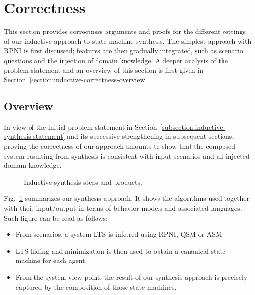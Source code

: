 \section{Correctness\label{section:inductive-correctness}}

This section provides correctness arguments and proofs for the different settings of our inductive approach to state machine synthesis. The simplest approach with RPNI is first discussed; features are then gradually integrated, such as scenario questions and the injection of domain knowledge. A deeper analysis of the problem statement and an overview of this section is first given in Section~\ref{section:inductive-correctness-overview}.

\subsection{Overview}

In view of the initial problem statement in Section~\ref{subsection:inductive-synthesis-statement} and its successive strengthening in subsequent sections, proving the correctness of our approach amounts to show that the composed system resulting from synthesis is consistent with input scenarios and all injected domain knowledge. 

\begin{figure}\centering
{}
\caption{Inductive synthesis steps and products.\label{figure:synthesis-flow-model}} 
\end{figure}

Fig.~\ref{figure:synthesis-flow-model} summarizes our synthesis approach. It shows the algorithms used together with their input/output in terms of behavior models and associated languages. Such figure can be read as follows:
\begin{itemize}
\item From scenarios, a system LTS is inferred using RPNI, QSM or ASM. 
\item LTS hiding and minimization is then used to obtain a canonical state machine for each agent. 
\item From the system view point, the result of our synthesis approach is precisely captured by the composition of those state machines.
\end{itemize}


